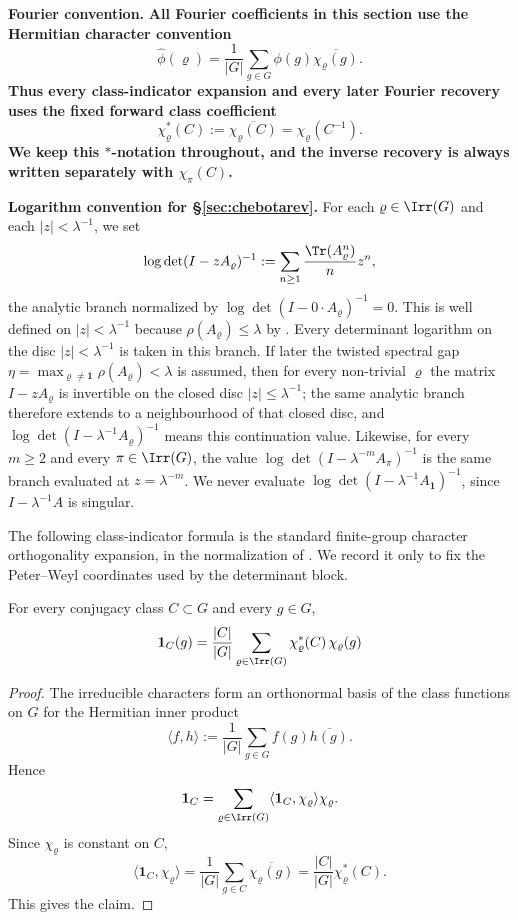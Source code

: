 \medskip
\noindent\textbf{Fourier convention.}
\textbf{All Fourier coefficients in this section use the Hermitian
character convention}
\[
  \widehat\phi(\varrho)
  =\frac{1}{|G|}\sum_{g\in G}\phi(g)\overline{\chi_\varrho(g)}.
\]
\textbf{Thus every class-indicator expansion and every later Fourier
recovery uses the fixed forward class coefficient}
\[
  \chi_\varrho^\ast(C)
  :=\overline{\chi_\varrho(C)}
  =\chi_\varrho(C^{-1}).
\]
\textbf{We keep this \(\ast\)-notation throughout, and the inverse recovery
is always written separately with \(\chi_\pi(C)\).}

\medskip
\noindent\textbf{Logarithm convention for \S\ref{sec:chebotarev}.}
For each \(\varrho\in\Irr(G)\) and each \(|z|<\lambda^{-1}\), we set
\[
  \log\det(I-zA_\varrho)^{-1}
  :=
  \sum_{n\ge 1}\frac{\Tr(A_\varrho^n)}{n}z^n,
\]
the analytic branch normalized by
\(\log\det(I-0\cdot A_\varrho)^{-1}=0\). This is well defined on
\(|z|<\lambda^{-1}\) because \(\rho(A_\varrho)\le \lambda\) by
. Every determinant logarithm
on the disc \(|z|<\lambda^{-1}\) is taken in this branch. If later the
twisted spectral gap
\(\eta=\max_{\varrho\neq\mathbf 1}\rho(A_\varrho)<\lambda\) is assumed,
then for every non-trivial \(\varrho\) the matrix \(I-zA_\varrho\) is
invertible on the closed disc \(|z|\le \lambda^{-1}\); the same analytic
branch therefore extends to a neighbourhood of that closed disc, and
\(\log\det(I-\lambda^{-1}A_\varrho)^{-1}\) means this continuation value.
Likewise, for every \(m\ge 2\) and every \(\pi\in\Irr(G)\), the value
\(\log\det(I-\lambda^{-m}A_\pi)^{-1}\) is the same branch evaluated at
\(z=\lambda^{-m}\). We never evaluate
\(\log\det(I-\lambda^{-1}A_{\mathbf 1})^{-1}\), since
\(I-\lambda^{-1}A\) is singular.

The following class-indicator formula is the standard finite-group character
orthogonality expansion, in the normalization of
\cite{Serre1977LinearRepresentations}.  We record it only to fix the
Peter--Weyl coordinates used by the determinant block.

\begin{proposition}
  \label{prop:class-indicator-expansion}
  For every conjugacy class \(C\subset G\) and every \(g\in G\),
  \[
    \mathbf 1_C(g)
    =\frac{|C|}{|G|}
      \sum_{\varrho\in\Irr(G)}
        \chi_\varrho^\ast(C)\,\chi_\varrho(g)
  \]
\end{proposition}

\begin{proof}
  The irreducible characters form an orthonormal basis of the class
  functions on \(G\) for the Hermitian inner product
  \[
    \langle f,h\rangle
    :=\frac{1}{|G|}\sum_{g\in G}f(g)\overline{h(g)}.
  \]
  Hence
  \[
    \mathbf 1_C
    =\sum_{\varrho\in\Irr(G)}
      \langle \mathbf 1_C,\chi_\varrho\rangle \chi_\varrho.
  \]
  Since \(\chi_\varrho\) is constant on \(C\),
  \[
    \langle \mathbf 1_C,\chi_\varrho\rangle
    =\frac{1}{|G|}\sum_{g\in C}\overline{\chi_\varrho(g)}
    =\frac{|C|}{|G|}\chi_\varrho^\ast(C).
  \]
  This gives the claim.
\end{proof}

